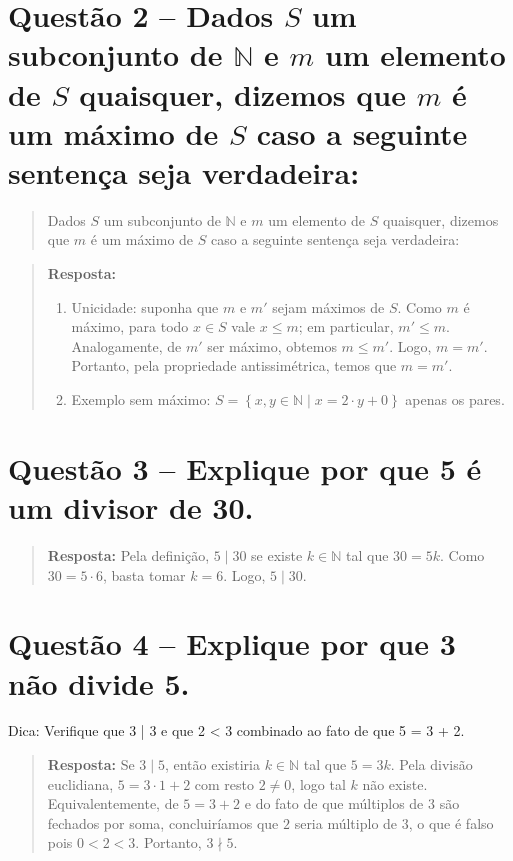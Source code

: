 \documentclass[12pt,a4paper]{article}
\newcommand{\answer}[1]{\begin{quote}#1\end{quote}}
\begin{document}
\section*{Questão 2 -- Dados $S$ um subconjunto de $\mathbb{N}$ e $m$ um elemento de $S$ quaisquer, dizemos que $m$ é um máximo de $S$ caso a seguinte sentença seja verdadeira:}
 \begin{quote}
    Dados $S$ um subconjunto de $\mathbb{N}$ e $m$ um elemento de $S$ quaisquer, dizemos que $m$ é um máximo de $S$ caso a seguinte sentença seja verdadeira:
 \end{quote}
    \answer{
        \textbf{Resposta:}
        \begin{enumerate}[label= (\alph*)]
            \item Unicidade: suponha que $m$ e $m'$ sejam máximos de $S$. Como $m$ é máximo, para todo $x \in S$ vale $x \leq m$; em particular, $m' \leq m$. Analogamente, de $m'$ ser máximo, obtemos $m \leq m'$. Logo, $m = m'$. Portanto, pela propriedade antissimétrica, temos que $m = m'$.
            \item Exemplo sem máximo: $S = \left\{x, y \in \mathbb{N} \mid x = 2 \cdot y + 0\right\}$ apenas os pares.
        \end{enumerate}
    }

\section*{Questão 3 -- Explique por que 5 é um divisor de 30.}
    \answer{
        \textbf{Resposta:}
        Pela definição, $5 \mid 30$ se existe $k \in \mathbb{N}$ tal que $30 = 5k$. Como $30 = 5 \cdot 6$, basta tomar $k=6$. Logo, $5 \mid 30$.
    }

\section*{Questão 4 -- Explique por que 3 não divide 5.}
Dica: Verifique que 3 | 3 e que 2 < 3 combinado ao fato de que 5 = 3 + 2.
    \answer{
        \textbf{Resposta:}
        Se $3 \mid 5$, então existiria $k \in \mathbb{N}$ tal que $5 = 3k$. Pela divisão euclidiana, $5 = 3\cdot 1 + 2$ com resto $2 \ne 0$, logo tal $k$ não existe. Equivalentemente, de $5 = 3 + 2$ e do fato de que múltiplos de $3$ são fechados por soma, concluiríamos que $2$ seria múltiplo de $3$, o que é falso pois $0 < 2 < 3$. Portanto, $3 \nmid 5$.
    }
\end{document}
